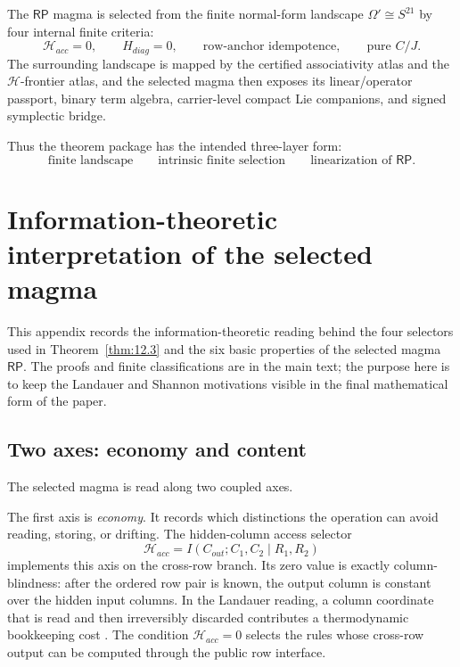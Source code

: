\documentclass[11pt]{article}
\theoremstyle{definition}
\newcommand{\RP}{\mathsf{RP}}
\begin{document}
The \(\RP\) magma is selected from the finite normal-form landscape
\(\Omega'\cong S^{21}\) by four internal finite criteria: \[
\mathcal H_{acc}=0,
\qquad
H_{diag}=0,
\qquad
\text{row-anchor idempotence},
\qquad
\text{pure }C/J.
\] The surrounding landscape is mapped by the certified associativity atlas and
the \(\mathcal H\)-frontier atlas, and the selected magma then exposes its
linear/operator passport, binary term algebra, carrier-level compact Lie
companions, and signed symplectic bridge.

Thus the theorem package has the intended three-layer form: \[
\boxed{\text{finite landscape}}
\qquad
\boxed{\text{intrinsic finite selection}}
\qquad
\boxed{\text{linearization of }\RP}.
\]


\appendix
\section{Information-theoretic interpretation of the selected magma}\label{appendix-information-theoretic-interpretation}

This appendix records the information-theoretic reading behind the four
selectors used in Theorem~\ref{thm:12.3} and the six basic properties of
the selected magma \(\RP\).  The proofs and finite classifications are in the
main text; the purpose here is to keep the Landauer and Shannon motivations
visible in the final mathematical form of the paper.

\subsection{Two axes: economy and content}\label{two-axes-economy-and-content}

The selected magma is read along two coupled axes.

The first axis is \emph{economy}.  It records which distinctions the
operation can avoid reading, storing, or drifting.  The hidden-column access
selector
\[
\mathcal H_{acc}=I(C_{out};C_1,C_2\mid R_1,R_2)
\]
implements this axis on the cross-row branch.  Its zero value is exactly
column-blindness: after the ordered row pair is known, the output column is
constant over the hidden input columns.  In the Landauer reading, a column
coordinate that is read and then irreversibly discarded contributes a
thermodynamic bookkeeping cost \cite{Landauer1961,Bennett1973,Bennett1982}.
The condition \(\mathcal H_{acc}=0\) selects the rules whose cross-row output
can be computed through the public row interface.
\end{document}

